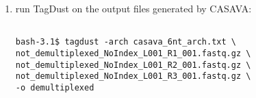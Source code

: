\documentclass[11pt,a4paper,oneside]{book}
\begin{document}
\begin{enumerate}
\item run TagDust on the output files generated by CASAVA:
\begin{verbatim}

bash-3.1$ tagdust -arch casava_6nt_arch.txt \
not_demultiplexed_NoIndex_L001_R1_001.fastq.gz \
not_demultiplexed_NoIndex_L001_R2_001.fastq.gz \
not_demultiplexed_NoIndex_L001_R3_001.fastq.gz \
-o demultiplexed
\end{verbatim}




\end{enumerate}


  




%

\end{document}
